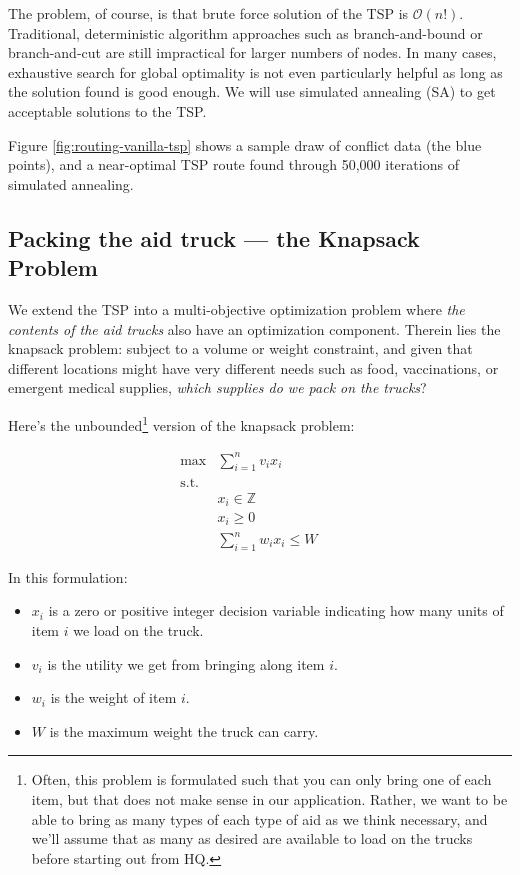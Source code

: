 \documentclass{article} %
\begin{document}
The problem, of course, is that brute force solution of the TSP is $\mathcal{O}$$(n!)$. Traditional, deterministic
algorithm approaches such as branch-and-bound or branch-and-cut are still impractical for larger numbers of nodes.
In many cases, exhaustive search for global optimality is not even particularly helpful as long as the solution
found is good enough. We will use simulated annealing (SA) to get acceptable solutions to the TSP.

Figure \ref{fig:routing-vanilla-tsp} shows a sample draw of conflict data (the blue points), and a near-optimal TSP route found through 50,000 iterations of simulated annealing.

\subsection{Packing the aid truck --- the Knapsack Problem}

We extend the TSP into a multi-objective optimization problem
where \emph{the contents of the aid trucks} also have an optimization component. Therein lies
the knapsack problem: subject to a volume or weight constraint, and given that different locations
might have very different needs such as food, vaccinations, or emergent medical supplies, \emph{which
supplies do we pack on the trucks}?

Here's the unbounded\footnote{Often, this problem is formulated such that you can only bring one of each item, but that does not make sense in our application. Rather, we want to be able to bring as many types of each type of aid as we think necessary, and we'll assume that as many as desired are available to load on the trucks before starting out from HQ.} version of the knapsack problem:

\begin{align*}
\max &\sum_{i=1}^n v_i x_i &&  \\
\mathrm{s.t.} & \\
    & x_i \in \mathbb{Z} \\
    & x_i \geq 0 \\
	& \sum_{i=1}^n w_ix_i \leq W
\end{align*}

In this formulation:

\begin{itemize}
  \item $x_{i}$ is a zero or positive integer decision variable indicating how many units of item $i$
        we load on the truck.
  \item $v_i$ is the utility we get from bringing along item $i$.
  \item $w_i$ is the weight of item $i$.
  \item $W$ is the maximum weight the truck can carry.
\end{itemize}
\end{document}
